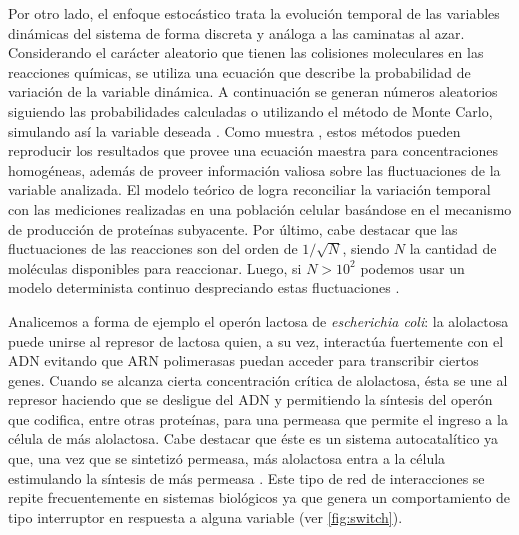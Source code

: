 Por otro lado, el enfoque estocástico trata la evolución temporal de las variables dinámicas del sistema de forma discreta y análoga a las caminatas al azar. Considerando el carácter aleatorio que tienen las colisiones moleculares en las reacciones químicas, se utiliza una ecuación que describe la probabilidad de variación de la variable dinámica. A continuación se generan números aleatorios siguiendo las probabilidades calculadas o utilizando el método de Monte Carlo, simulando así la variable deseada \citep{Gillespie1977}. Como muestra \cite{Gillespie1977}, estos métodos pueden reproducir los resultados que provee una ecuación maestra para concentraciones homogéneas, además de proveer información valiosa sobre las fluctuaciones de la variable analizada. El modelo teórico de \cite{Friedman2006} logra reconciliar la variación temporal con las mediciones realizadas en una población celular basándose en el mecanismo de producción de proteínas subyacente. Por último, cabe destacar que las fluctuaciones de las reacciones son del orden de $1/\sqrt{N}$, siendo $N$ la cantidad de moléculas disponibles para reaccionar. Luego, si $N>10^2$ podemos usar un modelo determinista continuo despreciando estas fluctuaciones \citep{Chen2010}.


Analicemos a forma de ejemplo el operón lactosa de \textit{escherichia coli}: la alolactosa puede unirse al represor de lactosa quien, a su vez, interactúa fuertemente con el ADN evitando que ARN polimerasas puedan acceder para transcribir ciertos genes. Cuando se alcanza cierta concentración crítica de alolactosa, ésta se une al represor haciendo que se desligue del ADN y permitiendo la síntesis del operón que codifica, entre otras proteínas, para una permeasa que permite el ingreso a la célula de más alolactosa. Cabe destacar que éste es un sistema autocatalítico ya que, una vez que se sintetizó permeasa, más alolactosa entra a la célula estimulando la síntesis de más permeasa \citep{Laurent1999}. Este tipo de red de interacciones se repite frecuentemente en sistemas biológicos ya que genera un comportamiento de tipo interruptor en respuesta a alguna variable (ver \cref{fig:switch}).

